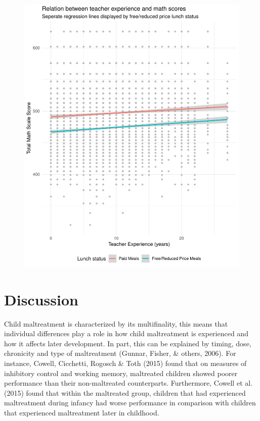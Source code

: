 \documentclass[man]{apa6}
\begin{document}
\begin{figure}
\centering
\includegraphics{Week_5_Lab_8_files/figure-latex/plot-1.pdf}
\caption{}
\end{figure}

\section{Discussion}\label{discussion}

Child maltreatment is characterized by its multifinality, this means
that individual differences play a role in how child maltreatment is
experienced and how it affects later development. In part, this can be
explained by timing, dose, chronicity and type of maltreatment (Gunnar,
Fisher, \& others, 2006). For instance, Cowell, Cicchetti, Rogosch \&
Toth (2015) found that on measures of inhibitory control and working
memory, maltreated children showed poorer performance than their
non-maltreated counterparts. Furthermore, Cowell et al. (2015) found
that within the maltreated group, children that had experienced
maltreatment during infancy had worse performance in comparison with
children that experienced maltreatment later in childhood.
\end{document}

